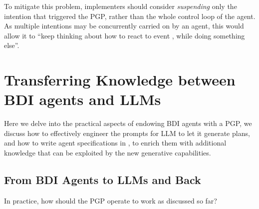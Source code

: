 To mitigate this problem,
implementers should consider \emph{suspending} only the intention that triggered the \ac{PGP},
rather than the whole control loop of the agent.
%
As multiple intentions may be concurrently carried on by an \agentspeak{} agent,
this would allow it to ``keep thinking about how to react to event ,
while doing something else''.



\section{Transferring Knowledge between \ac{BDI} agents and \acp{LLM}}\label{sec:remarks}

Here we delve into the practical aspects of endowing \ac{BDI} agents with a \ac{PGP},
we discuss
how to effectively engineer the prompts for \ac{LLM} to let it generate plans,
and
how to write agent specifications in \agentspeak{},
to enrich them with additional knowledge that can be exploited by the
new generative capabilities.

\subsection{From \acs{BDI} Agents to \acp{LLM} and Back}

In practice, how should the \ac{PGP} operate to work as discussed so far?

